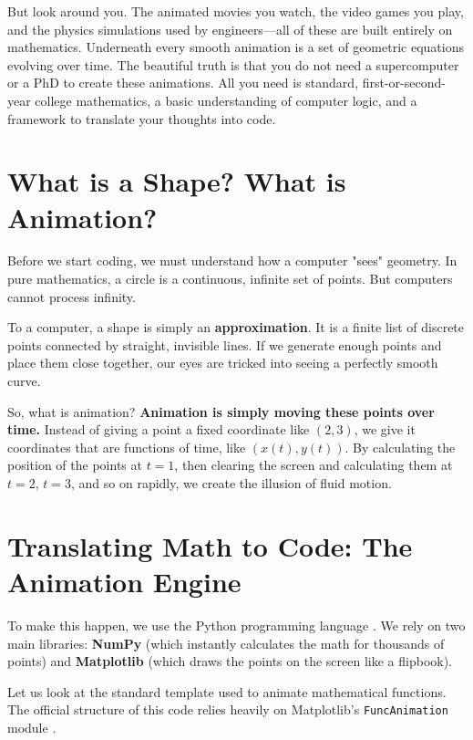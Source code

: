 \documentclass[12pt, a4paper]{report}
\begin{document}
But look around you. The animated movies you watch, the video games you play, and the physics simulations used by engineers—all of these are built entirely on mathematics. Underneath every smooth animation is a set of geometric equations evolving over time. The beautiful truth is that you do not need a supercomputer or a PhD to create these animations. All you need is standard, first-or-second-year college mathematics, a basic understanding of computer logic, and a framework to translate your thoughts into code. 

\section{What is a Shape? What is Animation?}

Before we start coding, we must understand how a computer "sees" geometry. In pure mathematics, a circle is a continuous, infinite set of points. But computers cannot process infinity. 

To a computer, a shape is simply an \textbf{approximation}. It is a finite list of discrete points connected by straight, invisible lines. If we generate enough points and place them close together, our eyes are tricked into seeing a perfectly smooth curve. 

So, what is animation? \textbf{Animation is simply moving these points over time.} Instead of giving a point a fixed coordinate like $(2, 3)$, we give it coordinates that are functions of time, like $(x(t), y(t))$. By calculating the position of the points at $t=1$, then clearing the screen and calculating them at $t=2$, $t=3$, and so on rapidly, we create the illusion of fluid motion.

\section{Translating Math to Code: The Animation Engine}

To make this happen, we use the Python programming language \cite{python_docs}. We rely on two main libraries: \textbf{NumPy} (which instantly calculates the math for thousands of points) and \textbf{Matplotlib} \cite{matplotlib_docs} (which draws the points on the screen like a flipbook).

Let us look at the standard template used to animate mathematical functions. The official structure of this code relies heavily on Matplotlib's \texttt{FuncAnimation} module \cite{matplotlib_docs}.
\end{document}
